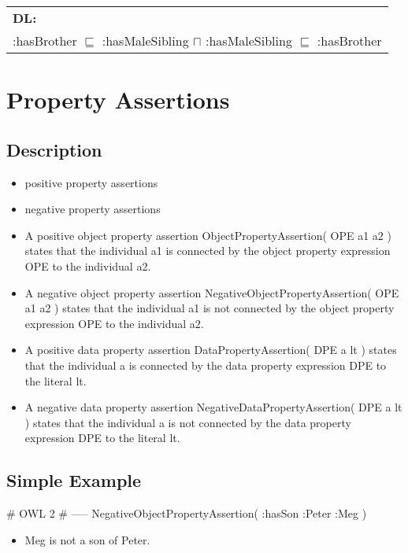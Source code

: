 \documentclass{llncs}
\newenvironment{DL}{
  \scriptsize
  \sffamily
  \vspace{0.3cm}
  \begin{tabular}{l}
	\textbf{DL:} \\

}{
  \end{tabular}
  \linebreak
}
\begin{document}
\begin{DL}
:hasBrother $\sqsubseteq$ :hasMaleSibling $\sqcap$ :hasMaleSibling $\sqsubseteq$ :hasBrother \\
\end{DL}

\section{Property Assertions}

\subsection{Description}

\begin{itemize}
	\item positive property assertions
  \item negative property assertions
	\item A positive object property assertion ObjectPropertyAssertion( OPE a1 a2 ) states that the individual a1 is connected by the object property expression OPE to the individual a2. 
	\item A negative object property assertion NegativeObjectPropertyAssertion( OPE a1 a2 ) states that the individual a1 is not connected by the object property expression OPE to the individual a2. 
	\item A positive data property assertion DataPropertyAssertion( DPE a lt ) states that the individual a is connected by the data property expression DPE to the literal lt. 
	\item A negative data property assertion NegativeDataPropertyAssertion( DPE a lt ) states that the individual a is not connected by the data property expression DPE to the literal lt.
\end{itemize}

\subsection{Simple Example}

\begin{ex}
# OWL 2
# -----
NegativeObjectPropertyAssertion( :hasSon :Peter :Meg )
\end{ex}

\begin{itemize}
	\item Meg is not a son of Peter.
\end{itemize}
\end{document}
